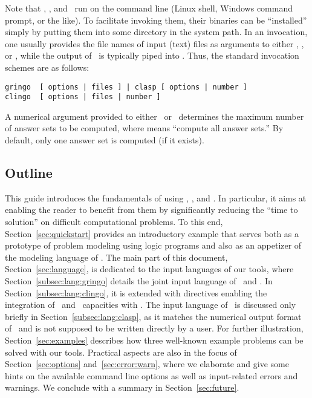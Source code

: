 Note that \gringo, \clasp, and \clingo\ 
run on the command line (Linux shell, Windows command prompt, or the like).
To facilitate invoking them, their binaries can be ``installed''
simply by putting them into some directory in the system path.
In an invocation,
one usually provides the file names of input (text) files 
as arguments to either \gringo, \clingo, or \iclingo{},
while the output of \gringo\ is typically piped into \clasp.
Thus, the standard invocation schemes are as follows:
\begin{lstlisting}[numbers=none]
gringo  [ options | files ] | clasp [ options | number ]
clingo  [ options | files | number ]
\end{lstlisting}
A numerical argument provided to either \clasp\ or \clingo\
determines the maximum number of answer sets to be computed,
where \code{0} means ``compute all answer sets.''
By default, only one answer set is computed (if it exists).

\subsection{Outline}

This guide introduces the fundamentals of using
\gringo, \clasp, and \clingo.
In particular, it aims at enabling the reader to benefit from them
by significantly reducing the ``time to solution'' on difficult computational problems.
To this end,
Section~\ref{sec:quickstart}
provides an introductory example 
that serves both as a prototype of problem modeling using logic programs
and also as an appetizer of the modeling language of \gringo.
The main part of this document, Section~\ref{sec:language},
is dedicated to the input languages of our tools,
where Section~\ref{subsec:lang:gringo}
details the joint input language of \gringo\ and \clingo.
In Section~\ref{subsec:lang:clingo}, it is extended with
directives enabling the integration of \python\ and \lua\ capacities with \clingo.
The input language of \clasp\ is discussed only briefly in Section~\ref{subsec:lang:clasp},
as it matches the numerical output format of \gringo\ and
is not supposed to be written directly by a user.
For %
further illustration,
Section~\ref{sec:examples} describes how three well-known example problems
can be solved with our tools.
Practical aspects are also in the focus of Section~\ref{sec:options} and~\ref{sec:error:warn},
where we elaborate and give some hints on the available command line options
as well as input-related errors and warnings. %
We conclude with a summary in Section~\ref{sec:future}.

